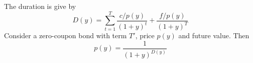 \documentclass{article}
\begin{document}
The duration is give by
\begin{equation}
	D(y)=\sum_{t=1}^{T}{\frac{c/p(y)}{(1+y)^{t}}+\frac{f/p(y)}{(1+y)^{T}}}
\end{equation}
Consider a zero-coupon bond with term $T'$, price $p(y)$ and future value. Then
\begin{equation}
p(y)=\frac{1}{(1+y)^{D(y)}}
\end{equation}
\end{document}
